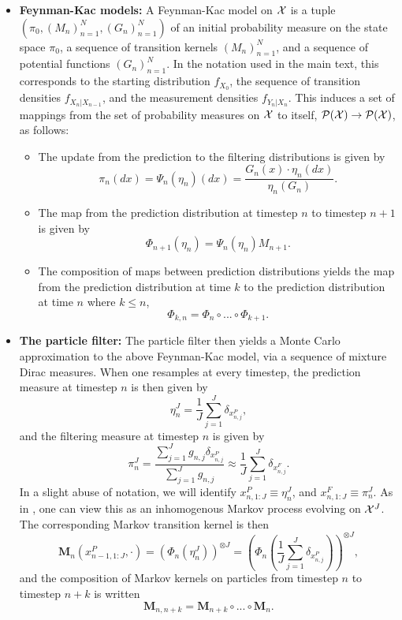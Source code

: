 \begin{itemize}
\item \textbf{Feynman-Kac models:} A Feynman-Kac model on ${\mathcal{X}}$ is a tuple $(\pi_0, (M_n)_{n=1}^N, (G_n)_{n=1}^N)$ of an initial probability measure on the state space $\pi_0$, a sequence of transition kernels $(M_n)_{n=1}^N$, and a sequence of potential functions $(G_n)_{n=1}^N$. In the notation used in the main text, this corresponds to the starting distribution $f_{X_0}$, the sequence of transition densities $f_{X_{n}|X_{n-1}}$, and the measurement densities $f_{Y_n|X_n}$. This induces a set of mappings from the set of probability measures on ${\mathcal{X}}$ to itself, $\mathcal{P}({\mathcal{X}}) \to \mathcal{P}({\mathcal{X}})$, as follows:
\begin{itemize}
    \item The update from the prediction to the filtering distributions is given by $$\pi_n(dx) = \Psi_n(\eta_n)(dx) = \frac{G_n(x)\cdot\eta_n(dx)}{\eta_n(G_n)}.$$
    \item The map from the prediction distribution at timestep $n$ to timestep $n+1$ is given by 
    $$\Phi_{n+1}(\eta_n) = \Psi_n(\eta_n) M_{n+1}.$$
    \item The composition of maps between prediction distributions yields the map from the prediction distribution at time $k$ to the prediction distribution at time $n$ where $k \leq n$,
    $$\Phi_{k,n} = \Phi_n \circ ... \circ \Phi_{k+1}.$$
\end{itemize}
\item \textbf{The particle filter:} The particle filter then yields a Monte Carlo approximation to the above Feynman-Kac model, via a sequence of mixture Dirac measures. When one resamples at every timestep, the prediction measure at timestep $n$ is then given by 
$$\eta_n^J = \frac{1}{J}\sum_{j=1}^J \delta_{x_{n,j}^P},$$
and the filtering measure at timestep $n$ is given by
$$\pi_n^J = \frac{\sum_{j=1}^J g_{n,j} \delta_{x_{n,j}^P}}{\sum_{j=1}^J g_{n,j}} \approx \frac{1}{J} \sum_{j=1}^J \delta_{x_{n,j}^F}.$$
In a slight abuse of notation, we will identify $x_{n, 1:J}^P \equiv \eta_n^J$, and $x_{n, 1:J}^F \equiv \pi_n^J$. 
As in \cite{karjalainen23}, one can view this as an inhomogenous Markov process evolving on ${\mathcal{X}}^{J}$. The corresponding Markov transition kernel is then 
$$\textbf{M}_n(x_{n-1, 1:J}^P, \cdot) = \left(\Phi_{n}\left(\eta_n^J\right)\right)^{\otimes J} = \left(\Phi_{n}\left(\frac{1}{J}\sum_{j=1}^J \delta_{x_{n,j}^P}\right)\right)^{\otimes J},$$
and the composition of Markov kernels on particles from timestep $n$ to timestep $n+k$ is written 
$$\textbf{M}_{n, n+k} = \textbf{M}_{n+k}\circ ...\circ \textbf{M}_n.$$

\end{itemize}

